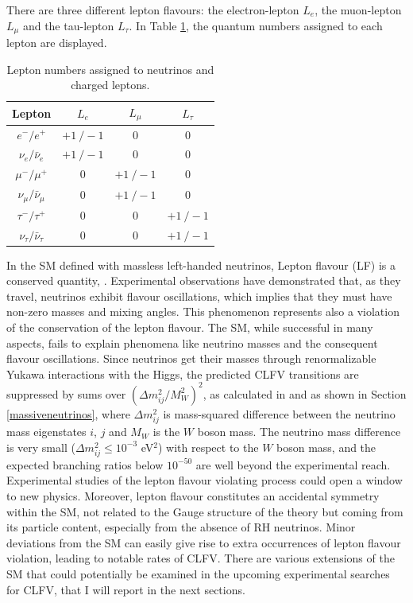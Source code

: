 There are three different lepton flavours: the electron-lepton $L_e$, 
the muon-lepton $L_{\mu}$ and the tau-lepton $L_{\tau}$. In Table 
\ref{tab:leptons}, the quantum numbers assigned to each lepton are displayed.
 \begin{center}  
\begin{table}[!h]
\centering
\renewcommand{\arraystretch}{1.5}
\begin{tabular}{c c c c}
\hline
Lepton & $L_e$ & $L_{\mu}$ & $L_{\tau}$\\
\hline
$e^-/e^+$ & $+1 \ /-1$ & 0 & 0 \\
$\nu_{e}/\bar{\nu}_{e}$ & $+1 \ /-1$ & 0 & 0 \\
$\mu^-/\mu^+$ & 0 & $+1 \ /-1$ & 0 \\
$\nu_{\mu}/\bar{\nu}_{\mu}$ & 0 & $+1 \ /-1$ & 0 \\
$\tau^-/\tau^+$ & 0 & 0 & $+1 \ /-1$\\
$\nu_{\tau}/\bar{\nu}_{\tau}$ & 0 & 0 & $+1 \ /-1$ \\
\hline
\end{tabular}
\caption{Lepton numbers assigned to neutrinos and charged leptons.}
\label{tab:leptons}
\end{table}
\end{center}
In the SM defined with massless 
left-handed neutrinos, Lepton flavour (LF) is a conserved quantity, 
\cite{universe8060299}. Experimental observations have 
demonstrated that, as they travel, neutrinos exhibit flavour 
oscillations, which implies that they must have non-zero masses 
and mixing angles. This phenomenon represents also a violation 
of the conservation of the lepton flavour. The SM, 
while successful in many aspects, fails to explain phenomena 
like neutrino masses and the consequent flavour oscillations. 
Since neutrinos get their masses through renormalizable Yukawa interactions
with the Higgs, the predicted CLFV transitions are suppressed 
by sums over $(\Delta m^2_{i j}/M^2 _W)^2$, as calculated in 
\cite{MARCIANO1977303} and as shown in Section 
\ref{massiveneutrinos}, where $\Delta m^2_{ij}$ is mass-squared 
difference between the neutrino mass eigenstates $i$, $j$ and 
$M_W$ is the $W$ boson mass. The neutrino mass difference is 
very small ($\Delta m^2 _{i j} \leq 10^{-3}$ eV$^2$) with respect to the $W$ boson mass,
and the expected branching ratios  
below $10^{-50}$ are well beyond the experimental reach. Experimental studies 
of the lepton flavour violating process could open a window to new physics. 
Moreover, lepton flavour constitutes an accidental symmetry within the SM, 
not related to the Gauge structure of the theory but coming
from its particle content, especially from the absence of RH neutrinos. 
Minor deviations from the SM can easily give rise to extra 
occurrences of lepton flavour violation, leading to notable rates of CLFV.
There are various extensions of the SM that could potentially 
be examined in the upcoming experimental searches for CLFV, that 
I will report in the next sections.


